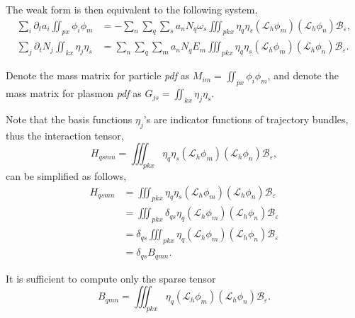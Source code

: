 \documentclass{article}
\numberwithin{equation}{section}
\begin{document}
The weak form is then equivalent to the following system,
\begin{equation}\label{eq_ode_sys}
    \begin{split}
        \sum_{i}\partial_{t}a_{i}\iint_{px}\phi_{i}\phi_{m}&=-\sum_{n}\sum_{q}\sum_{s}a_{n}N_{q}\omega_{s}\iiint_{pkx}\eta_{q}\eta_{s}\left(\mathcal{L}_{h}\phi_{m}\right)\left(\mathcal{L}_{h}\phi_{n}\right)\mathcal{B}_{\varepsilon},\\
        \sum_{j}\partial_{t}N_{j}\iint_{kx}\eta_{j}\eta_{s}&= \sum_{n}\sum_{q}\sum_{m}a_{n}N_{q}E_{m}\iiint_{pkx}\eta_{q}\eta_{s}\left(\mathcal{L}_{h}\phi_{m}\right)\left(\mathcal{L}_{h}\phi_{n}\right)\mathcal{B}_{\varepsilon}.
    \end{split}
\end{equation}

Denote the mass matrix for particle \textit{pdf} as $M_{im}=\iint_{px}\phi_{i}\phi_{m}$, and denote the mass matrix for plasmon \textit{pdf} as $G_{js}=\iint_{kx}\eta_{j}\eta_{s}$.

Note that the basis functions $\eta_{j}$'s are indicator functions of trajectory bundles, thus the interaction tensor,
\begin{equation*}
    H_{qsmn}=\iiint_{pkx}\eta_{q}\eta_{s}\left(\mathcal{L}_{h}\phi_{m}\right)\left(\mathcal{L}_{h}\phi_{n}\right)\mathcal{B}_{\varepsilon},
\end{equation*}
can be simplified as follows, 
\begin{equation*}
    \begin{split}
        H_{qsmn}
        &=\iiint_{pkx}\eta_{q}\eta_{s}\left(\mathcal{L}_{h}\phi_{m}\right)\left(\mathcal{L}_{h}\phi_{n}\right)\mathcal{B}_{\varepsilon}\\
        &=\iiint_{pkx}\delta_{qs}\eta_{q}\left(\mathcal{L}_{h}\phi_{m}\right)\left(\mathcal{L}_{h}\phi_{n}\right)\mathcal{B}_{\varepsilon}\\
        &=\delta_{qs}\iiint_{pkx}\eta_{q}\left(\mathcal{L}_{h}\phi_{m}\right)\left(\mathcal{L}_{h}\phi_{n}\right)\mathcal{B}_{\varepsilon}\\
        &=\delta_{qs}B_{qmn}.
    \end{split}
\end{equation*}

It is sufficient to compute only the sparse tensor
\begin{equation*}
    B_{qmn}=\iiint_{pkx}\eta_{q}\left(\mathcal{L}_{h}\phi_{m}\right)\left(\mathcal{L}_{h}\phi_{n}\right)\mathcal{B}_{\varepsilon}.
\end{equation*}
\end{document}
